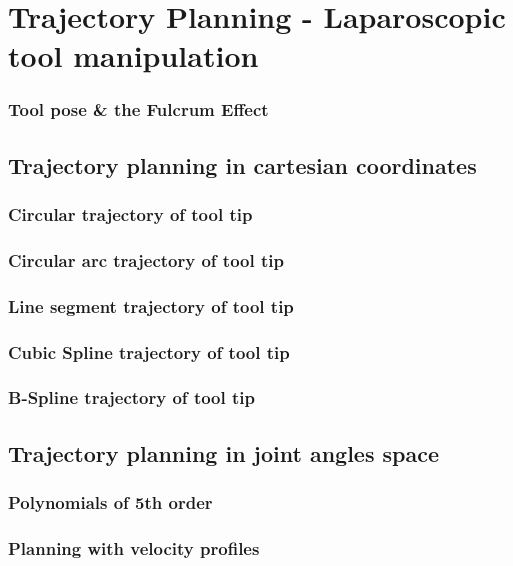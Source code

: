 \section{Trajectory Planning - Laparoscopic tool manipulation}

\begin{frame}
\frametitle{Tool pose \& the Fulcrum Effect}
\end{frame}

\subsection{Trajectory planning in cartesian coordinates}

\begin{frame}
\frametitle{Circular trajectory of tool tip}
\end{frame}

\begin{frame}
\frametitle{Circular arc trajectory of tool tip}
\end{frame}

\begin{frame}
\frametitle{Line segment trajectory of tool tip}
\end{frame}

\begin{frame}
\frametitle{Cubic Spline trajectory of tool tip}
\end{frame}

\begin{frame}
\frametitle{B-Spline trajectory of tool tip}
\end{frame}

\subsection{Trajectory planning in joint angles space}

\begin{frame}
\frametitle{Polynomials of 5th order}
\end{frame}

\begin{frame}
\frametitle{Planning with velocity profiles}
\end{frame}